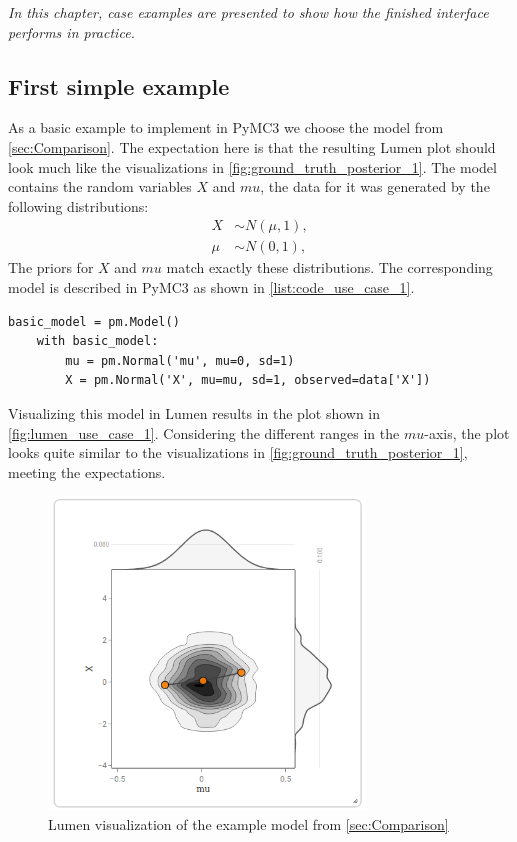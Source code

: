 \documentclass{article}
\begin{document}
\textit{In this chapter, case examples are presented to show how the finished interface performs in practice.}

\subsection{First simple example}
As a basic example to implement in PyMC3 we choose the model from \autoref{sec:Comparison}. The expectation here is that the resulting Lumen plot should look much like the visualizations in \autoref{fig:ground_truth_posterior_1}. The model contains the random variables $X$ and $mu$, the data for it was generated by the following  distributions:
\begin{equation}
\begin{split}
X &\sim N(\mu,1), \\
\mu &\sim N(0,1),
\end{split}
\end{equation}
The priors for $X$ and $mu$ match exactly these distributions. The corresponding model is described in PyMC3 as shown in \autoref{list:code_use_case_1}.
\begin{lstlisting}[caption={PyMC3 model of use case 1}, label={list:code_use_case_1},captionpos=b]
    basic_model = pm.Model()
    with basic_model:
        mu = pm.Normal('mu', mu=0, sd=1)
        X = pm.Normal('X', mu=mu, sd=1, observed=data['X'])
\end{lstlisting}
Visualizing this model in Lumen results in the plot shown in \autoref{fig:lumen_use_case_1}. Considering the different ranges in the $mu$-axis, the plot looks quite similar to the visualizations in \autoref{fig:ground_truth_posterior_1}, meeting the expectations.
\begin{figure}
	\centering
	\includegraphics[width=0.75\textwidth]{images/lumen_use_case_1_2.png}
	\caption{Lumen visualization of the example model from \autoref{sec:Comparison}}
	\label{fig:lumen_use_case_1}
\end{figure}
\end{document}
